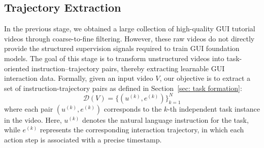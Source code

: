 \documentclass{llmxive}
\begin{document}


\subsection{Trajectory Extraction}
\label{subsec: trajectory extraction}

In the previous stage, we obtained a large collection of high-quality GUI tutorial videos through coarse-to-fine filtering. However, these raw videos do not directly provide the structured supervision signals required to train GUI foundation models. The goal of this stage is to transform unstructured videos into task-oriented instruction–trajectory pairs, thereby extracting learnable GUI interaction data.
Formally, given an input video $V$, our objective is to extract a set of instruction-trajectory pairs as defined in Section~\ref{sec: task formation}:
\begin{equation}
    \mathcal{D}(V) = \{ (u^{(k)}, e^{(k)}) \}_{k=1}^N
\end{equation}
where each pair $(u^{(k)}, e^{(k)})$ corresponds to the $k$-th independent task instance in the video. Here, $u^{(k)}$ denotes the natural language instruction for the task, while $e^{(k)}$ represents the corresponding interaction trajectory, in which each action step is associated with a precise timestamp.
\end{document}
